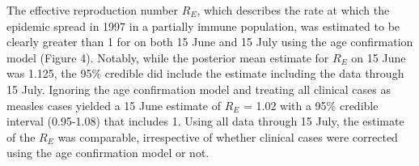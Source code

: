 The effective reproduction number $R_E$, which describes the rate at which the epidemic spread in 1997 in a partially immune population, was estimated to be clearly greater than 1 for on both 15 June and 15 July using the age confirmation model (Figure 4). Notably, while the posterior mean
estimate for $R_E$ on 15 June was 1.125, the 95\% credible did include the estimate including the data through 15 July. Ignoring the age
confirmation model and treating all clinical cases as measles cases yielded a 15 June estimate of $R_E$ = 1.02 with a 95\% credible interval
(0.95-1.08) that includes 1. Using all data through 15 July, the estimate of the $R_E$ was comparable, irrespective of whether clinical cases were corrected using the age confirmation model or not.